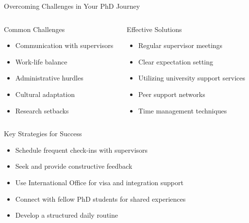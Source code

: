 \documentclass[10pt]{beamer}
\begin{document}
\begin{frame}[fragile]{Overcoming Challenges in Your PhD Journey}
\begin{columns}[T]
    \begin{column}{0.5\textwidth}
        \alert{Common Challenges}
        \begin{itemize}
            \item Communication with supervisors
            \item Work-life balance
            \item Administrative hurdles
            \item Cultural adaptation
            \item Research setbacks
        \end{itemize}
    \end{column}
    \begin{column}{0.5\textwidth}
        \alert{Effective Solutions}
        \begin{itemize}
            \item Regular supervisor meetings
            \item Clear expectation setting
            \item Utilizing university support services
            \item Peer support networks
            \item Time management techniques
        \end{itemize}
    \end{column}
\end{columns}

\vspace{0.3cm}
\alert{Key Strategies for Success}
\begin{itemize}
    \item Schedule frequent check-ins with supervisors
    \item Seek and provide constructive feedback
    \item Use International Office for visa and integration support
    \item Connect with fellow PhD students for shared experiences
    \item Develop a structured daily routine
\end{itemize}

\end{frame}
\end{document}
